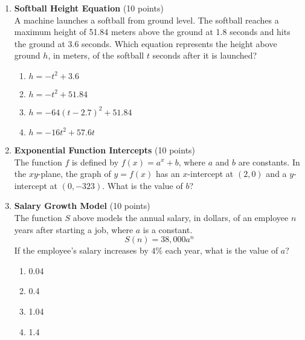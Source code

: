 \begin{enumerate}
  \item \textbf{Softball Height Equation} (10 points)\\
  A machine launches a softball from ground level. The softball reaches a maximum height of 51.84 meters above the ground at 1.8 seconds and hits the ground at 3.6 seconds. Which equation represents the height above ground $h$, in meters, of the softball $t$ seconds after it is launched?
  \begin{enumerate}[label=(\Alph*)]
    \item $h=-t^{2}+3.6$
    \item $h=-t^{2}+51.84$
    \item $h=-64(t-2.7)^{2}+51.84$
    \item $h=-16t^{2}+57.6t$
  \end{enumerate}
  \begin{subanswer}
  \end{subanswer}

  \item \textbf{Exponential Function Intercepts} (10 points)\\
  The function $f$ is defined by $f(x)=a^{x}+b$, where $a$ and $b$ are constants. In the $xy$-plane, the graph of $y=f(x)$ has an $x$-intercept at $(2,0)$ and a $y$-intercept at $(0,-323)$. What is the value of $b$?
  \begin{subanswer}
  \end{subanswer}

  \item \textbf{Salary Growth Model} (10 points)\\
  The function $S$ above models the annual salary, in dollars, of an employee $n$ years after starting a job, where $a$ is a constant.
  \[
  S(n)=38,000 a^{n}
  \]
  If the employee's salary increases by $4\%$ each year, what is the value of $a$?
  \begin{enumerate}[label=(\Alph*)]
    \item 0.04
    \item 0.4
    \item 1.04
    \item 1.4
  \end{enumerate}
  \begin{subanswer}
  \end{subanswer}


\end{enumerate}
